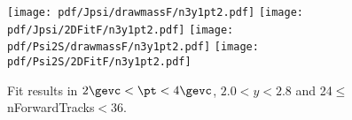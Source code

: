 \begin{figure}[H]
\begin{center}
\texttt{[image: pdf/Jpsi/drawmassF/n3y1pt2.pdf]}
\texttt{[image: pdf/Jpsi/2DFitF/n3y1pt2.pdf]}
\vspace*{-0.5cm}
\texttt{[image: pdf/Psi2S/drawmassF/n3y1pt2.pdf]}
\texttt{[image: pdf/Psi2S/2DFitF/n3y1pt2.pdf]}
\vspace*{-0.5cm}
\end{center}
\caption{Fit results in $2\gevc<\pt<4\gevc$, $2.0<y<2.8$ and 24$\leq$nForwardTracks$<$36.}
\label{Fitn3y1pt2}
\end{figure}
